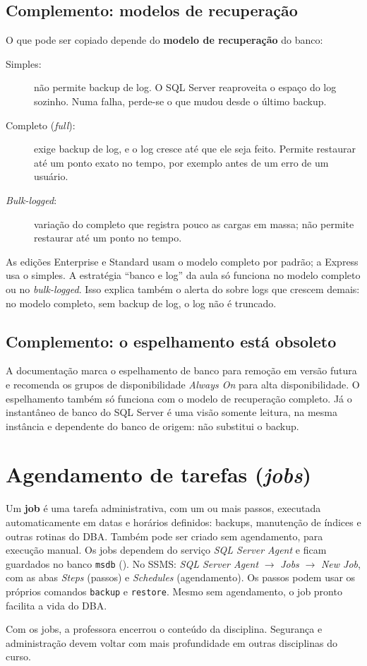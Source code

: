\subsection*{Complemento: modelos de recuperação}

O que pode ser copiado depende do \textbf{modelo de recuperação} do
banco:

\begin{description}
	\item[Simples:] não permite backup de log. O SQL Server reaproveita o
	espaço do log sozinho. Numa falha, perde-se o que mudou desde o
	último backup.
	\item[Completo (\emph{full}):] exige backup de log, e o log cresce até
	que ele seja feito. Permite restaurar até um ponto exato no tempo,
	por exemplo antes de um erro de um usuário.
	\item[\emph{Bulk-logged}:] variação do completo que registra pouco as
	cargas em massa; não permite restaurar até um ponto no tempo.
\end{description}

As edições Enterprise e Standard usam o modelo completo por padrão; a
Express usa o simples. A estratégia ``banco e log'' da aula só funciona
no modelo completo ou no \emph{bulk-logged}. Isso explica também o
alerta do  sobre logs que crescem demais: no
modelo completo, sem backup de log, o log não é truncado.

\subsection*{Complemento: o espelhamento está obsoleto}

A documentação marca o espelhamento de banco para remoção em versão
futura e recomenda os grupos de disponibilidade \emph{Always On} para
alta disponibilidade. O espelhamento também só
funciona com o modelo de recuperação completo. Já o instantâneo de banco
do SQL Server é uma visão somente leitura, na mesma instância e
dependente do banco de origem: não substitui o backup.

\section{Agendamento de tarefas (\emph{jobs})}

Um \textbf{job} é uma tarefa administrativa, com um ou mais
passos, executada automaticamente em datas e horários definidos: backups,
manutenção de índices e outras rotinas do DBA. Também pode ser criado
sem agendamento, para execução manual. Os jobs dependem do serviço
\emph{SQL Server Agent} e ficam guardados no banco \texttt{msdb}
(). No SSMS: \emph{SQL Server Agent}
$\rightarrow$ \emph{Jobs} $\rightarrow$ \emph{New Job}, com as abas
\emph{Steps} (passos) e \emph{Schedules} (agendamento). Os passos podem
usar os próprios comandos \texttt{backup} e \texttt{restore}. Mesmo sem
agendamento, o job pronto facilita a vida do DBA.

Com os jobs, a professora encerrou o conteúdo da disciplina. Segurança e
administração devem voltar com mais profundidade em outras disciplinas
do curso.
